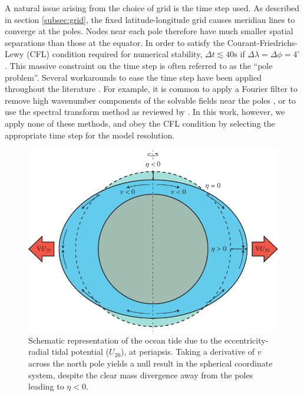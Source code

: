 A natural issue arising from the choice of grid is the time step used. As described in section \ref{subsec:grid}, the fixed latitude-longitude grid causes meridian lines to converge at the poles. Nodes near each pole therefore have much smaller spatial separations than those at the equator. In order to satisfy the Courant-Friedrichs-Lewy (CFL) condition required for numerical stability, $\Delta t \lesssim 40 \si{\second}$ if $\Delta \lambda = \Delta \phi = 4^{\circ}$ \citep{arakawa1977computational,sears1995tidal}. This massive constraint on the time step is often referred to as the ``pole problem''. Several workarounds to ease the time step have been applied throughout the literature \citep{comblen2009finite}. For example, it is common to apply a Fourier filter to remove high wavenumber components of the solvable fields near the poles \citep{murray2002fourier}, or to use the spectral transform method as reviewed by \citet{swarztrauber1996spectral}. In this work, however, we apply none of these methods, and obey the CFL condition by selecting the appropriate time step for the model resolution.

\begin{figure}[!b]
\includegraphics[width=\linewidth]{Figures/CoordProb}
\caption{Schematic representation of the ocean tide due to the eccentricity-radial tidal potential ($U_{20}$), at periapsis. Taking a derivative of $v$ across the north pole yields a null result in the spherical coordinate system, despite the clear mass divergence away from the poles leading to $\eta < 0$.\label{fig:coord_prob}}
\end{figure}


